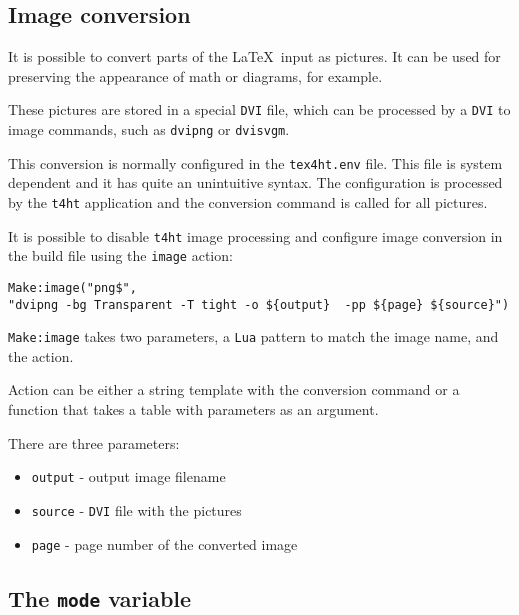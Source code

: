 \hypertarget{image-conversion}{%
\subsection{Image conversion}\label{image-conversion}}

\label{sec:imageconversion}

It is possible to convert parts of the \LaTeX~input as pictures. It can
be used for preserving the appearance of math or diagrams, for example.

These pictures are stored in a special \texttt{DVI} file, which can be
processed by a \texttt{DVI} to image commands, such as \texttt{dvipng}
or \texttt{dvisvgm}.

This conversion is normally configured in the \texttt{tex4ht.env} file.
This file is system dependent and it has quite an unintuitive syntax.
The configuration is processed by the \texttt{t4ht} application and the
conversion command is called for all pictures.

It is possible to disable \texttt{t4ht} image processing and configure
image conversion in the build file using the \texttt{image} action:

\begin{verbatim}
Make:image("png$",
"dvipng -bg Transparent -T tight -o ${output}  -pp ${page} ${source}")
\end{verbatim}

\texttt{Make:image} takes two parameters, a \texttt{Lua} pattern to
match the image name, and the action.

Action can be either a string template with the conversion command or a
function that takes a table with parameters as an argument.

There are three parameters:

\begin{itemize}
\tightlist
\item
  \texttt{output} - output image filename
\item
  \texttt{source} - \texttt{DVI} file with the pictures
\item
  \texttt{page} - page number of the converted image
\end{itemize}

\hypertarget{the-mode-variable}{%
\subsection{\texorpdfstring{The \texttt{mode}
variable}{The mode variable}}\label{the-mode-variable}}

